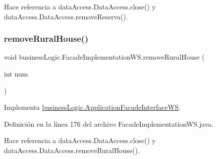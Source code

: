 \begin{DoxyCode}{0}

\end{DoxyCode}


Hace referencia a data\+Access.\+Data\+Access.\+close() y data\+Access.\+Data\+Access.\+remove\+Reserva().

\mbox{\label{classbusiness_logic_1_1_facade_implementation_w_s_a4d0fe8c220dc334e527a3e7b4cc9edca}} 
\subsubsection{\texorpdfstring{removeRuralHouse()}{removeRuralHouse()}}
{\footnotesize\ttfamily void business\+Logic.\+Facade\+Implementation\+W\+S.\+remove\+Rural\+House (\begin{DoxyParamCaption}\item[{int}]{num }\end{DoxyParamCaption})}



Implementa \mbox{\hyperlink{interfacebusiness_logic_1_1_application_facade_interface_w_s_a472d0eae303dc4ad989f382bb0632afc}{business\+Logic.\+Application\+Facade\+Interface\+WS}}.



Definición en la línea 176 del archivo Facade\+Implementation\+W\+S.\+java.


\begin{DoxyCode}{0}

\end{DoxyCode}


Hace referencia a data\+Access.\+Data\+Access.\+close() y data\+Access.\+Data\+Access.\+remove\+Rural\+House().

